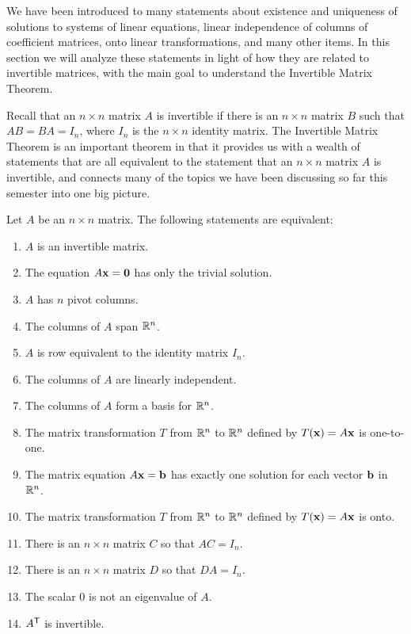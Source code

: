 \label{sec:imt}

We have been introduced to many statements about existence and uniqueness of solutions to systems of linear equations, linear independence of columns of coefficient matrices, onto linear transformations, and many other items. In this section we will analyze these statements in light of how they are related to invertible matrices, with the main goal to understand the Invertible Matrix Theorem. 

Recall that an $n \times n$ matrix $A$ is invertible if there is an $n \times n$ matrix $B$ such that $AB = BA = I_n$, where $I_n$ is the $n \times n$ identity matrix. The Invertible Matrix Theorem is an important theorem in that it provides us with a wealth of statements that are all equivalent to the statement that an $n \times n$ matrix $A$ is invertible, and connects many of the topics we have been discussing so far this semester into one big picture. 



\begin{theorem} Let $A$ be an $n \times n$ matrix. The following statements are equivalent:
\begin{enumerate}
\item $A$ is an invertible matrix.
\item \label{item:trivial_soln} The equation $A \mathbf{x} = \mathbf{0}$ has only the trivial solution.
\item $A$ has $n$ pivot columns. 
\item The columns of $A$ span $\mathbb{R}^n$.
\item $A$ is row equivalent to the identity matrix $I_n$.
\item The columns of $A$ are linearly independent.
\item The columns of $A$ form a basis for $\mathbb{R}^n$.
\item The matrix transformation $T$ from $\mathbb{R}^n$ to $\mathbb{R}^n$ defined by $T(\mathbf{x}) = A\mathbf{x}$ is one-to-one.
\item The matrix equation $A \mathbf{x} = \mathbf{b}$ has exactly one solution for each vector $\mathbf{b}$ in $\mathbb{R}^n$.
\item The matrix transformation $T$ from $\mathbb{R}^n$ to $\mathbb{R}^n$ defined by $T(\mathbf{x}) = A\mathbf{x}$ is onto.
\item \label{item:AC_I} There is an $n \times n$ matrix $C$ so that $AC = I_n$.
\item \label{item:DA_I} There is an $n \times n$ matrix $D$ so that $DA = I_n$.
\item The scalar 0 is not an eigenvalue of $A$.
\item $A^{\mathsf{T}}$ is invertible.
\end{enumerate}
\end{theorem}




